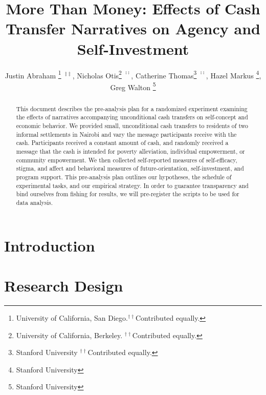 \documentclass[11pt, a4paper]{article}\usepackage[]{graphicx}\usepackage[]{color}
\begin{document}
\title{More Than Money: Effects of Cash Transfer Narratives on Agency and Self-Investment}
\begin{onehalfspace}

\author{
  Justin Abraham \thanks{University of California, San Diego.$^{\dagger\dagger}$Contributed
equally.}~$^{\ddagger\ddagger}$,
  Nicholas Otis\thanks{University of California, Berkeley. $^{\dagger\dagger}$Contributed
equally.}~$^{^{\ddagger\ddagger}}$,
  Catherine Thomas\thanks{Stanford University $^{\dagger\dagger}$Contributed equally.}~$^{^{\ddagger\ddagger}}$,
  Hazel Markus \thanks{Stanford University },
  Greg Walton \thanks{Stanford University }
        }

\end{onehalfspace}

\maketitle

\begin{abstract}

    This document describes the pre-analysis plan for a randomized experiment examining the effects of narratives accompanying unconditional cash transfers on self-concept and economic behavior. We provided small, unconditional cash transfers to residents of two informal settlements in Nairobi and vary the message participants receive with the cash. Participants received a constant amount of cash, and randomly received a message that the cash is intended for poverty alleviation, individual empowerment, or community empowerment. We then collected self-reported measures of self-efficacy, stigma, and affect and behavioral measures of future-orientation, self-investment, and program support. This pre-analysis plan outlines our hypotheses, the schedule of experimental tasks, and our empirical strategy. In order to guarantee transparency and bind ourselves from fishing for results, we will pre-register the scripts to be used for data analysis.

\end{abstract}

\newpage

\tableofcontents

\newpage

\section{Introduction}

\section{Research Design}
\end{document}
